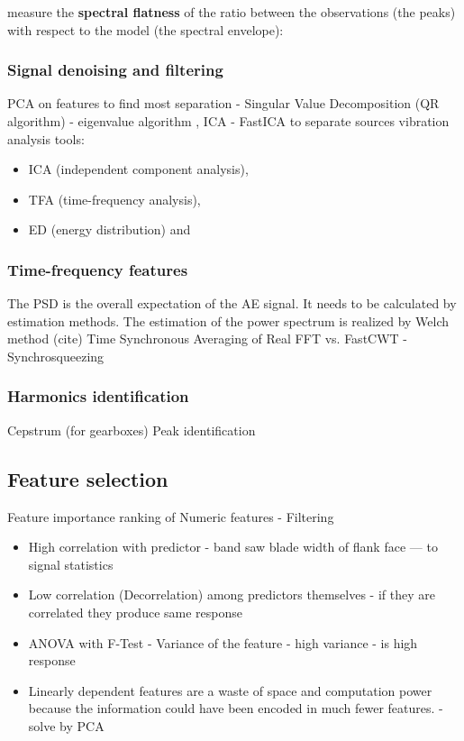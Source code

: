 \cite{lagrange_robust_2010}
measure the \textbf{spectral flatness} of the ratio between the observations (the peaks) with respect to the model (the spectral envelope):


\subsubsection{Signal denoising and filtering}
PCA on features to find most separation - Singular Value Decomposition (QR algorithm) - eigenvalue algorithm , 
ICA - FastICA to separate sources
vibration analysis tools:
\begin{itemize}
\item ICA (independent component analysis),
\item TFA (time-frequency analysis),
\item ED (energy distribution) and
\end{itemize}

\subsubsection{Time-frequency features}
The PSD is the overall expectation of the AE signal. It needs to be calculated by estimation methods. The estimation of the power spectrum is realized by Welch method (cite)
Time Synchronous Averaging of Real FFT vs. FastCWT - Synchrosqueezing

\subsubsection{Harmonics identification}
Cepstrum (for  gearboxes)
Peak identification


\subsection{Feature selection}
Feature importance ranking of Numeric features - Filtering
\begin{itemize}
\item High correlation with predictor - band saw blade width of flank face --- to signal statistics
\item Low correlation (Decorrelation) among predictors themselves - if they are correlated they produce same response
\item ANOVA with F-Test - Variance of the feature - high variance - is high response
\item Linearly dependent features are a waste of space and computation power because the information could have been encoded in much fewer features. \cite{zheng_feature_2018} - solve by PCA
\end{itemize}

